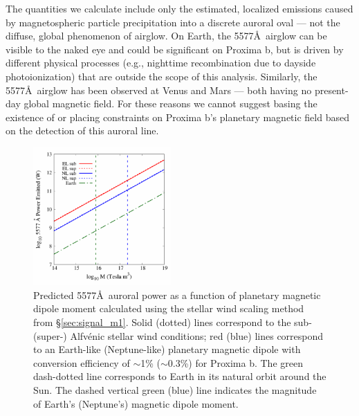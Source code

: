 \documentclass{emulateapj}
\begin{document}
The quantities we calculate include only the estimated, localized emissions caused by magnetospheric particle precipitation into a discrete auroral oval --- not the diffuse, global phenomenon of airglow. On Earth, the 5577\AA\ airglow can be visible to the naked eye and could be significant on Proxima b, but is driven by different physical processes (e.g., nighttime recombination due to dayside photoionization) that are outside the scope of this analysis. Similarly, the 5577\AA\ airglow has been observed at Venus \citep[e.g.][]{Slanger2001} and Mars \citep[e.g.][]{Seth2002} --- both having no present-day global magnetic field. For these reasons we cannot suggest basing the existence of or placing constraints on Proxima b's planetary magnetic field based on the detection of this auroral line.




\begin{figure}[bt]
\includegraphics[width=0.47\textwidth, angle=0]{plot_swpower.pdf}
\caption{Predicted 5577\AA\ auroral power as a function of planetary magnetic dipole moment calculated using the stellar wind scaling method from \S\ref{sec:signal_m1}. Solid (dotted) lines correspond to the sub-\mbox{(super-)} Alfv\'{e}nic stellar wind conditions; red (blue) lines correspond to an Earth-like (Neptune-like) planetary magnetic dipole with conversion efficiency of $\sim$1\% ($\sim$0.3\%) for Proxima b. The green dash-dotted line corresponds to Earth in its natural orbit around the Sun. The dashed vertical green (blue) line indicates the magnitude of Earth's (Neptune's) magnetic dipole moment.\\[0in]}
\label{fig:auroral_power}
\end{figure}
\end{document}
